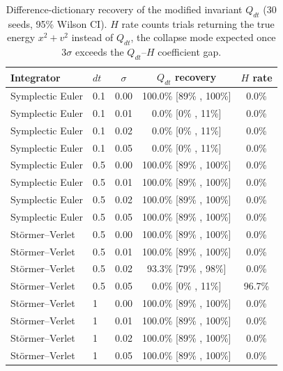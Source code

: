 \documentclass{article}
\begin{document}
\begin{table}[ht]
\centering
\caption{Difference-dictionary recovery of the modified invariant $Q_{dt}$ (30 seeds, 95\% Wilson CI). $H$ rate counts trials returning the true energy $x^2+v^2$ instead of $Q_{dt}$, the collapse mode expected once $3\sigma$ exceeds the $Q_{dt}$--$H$ coefficient gap.}
\label{tab:diff-dict-generality}
\begin{tabular}{llccc}
\toprule
Integrator & $dt$ & $\sigma$ & $Q_{dt}$ recovery & $H$ rate \\
\midrule
Symplectic Euler & 0.1 & 0.00 & 100.0\% [89\% , 100\%] & 0.0\% \\
Symplectic Euler & 0.1 & 0.01 & 0.0\% [0\% , 11\%] & 0.0\% \\
Symplectic Euler & 0.1 & 0.02 & 0.0\% [0\% , 11\%] & 0.0\% \\
Symplectic Euler & 0.1 & 0.05 & 0.0\% [0\% , 11\%] & 0.0\% \\
Symplectic Euler & 0.5 & 0.00 & 100.0\% [89\% , 100\%] & 0.0\% \\
Symplectic Euler & 0.5 & 0.01 & 100.0\% [89\% , 100\%] & 0.0\% \\
Symplectic Euler & 0.5 & 0.02 & 100.0\% [89\% , 100\%] & 0.0\% \\
Symplectic Euler & 0.5 & 0.05 & 100.0\% [89\% , 100\%] & 0.0\% \\
St\"{o}rmer--Verlet & 0.5 & 0.00 & 100.0\% [89\% , 100\%] & 0.0\% \\
St\"{o}rmer--Verlet & 0.5 & 0.01 & 100.0\% [89\% , 100\%] & 0.0\% \\
St\"{o}rmer--Verlet & 0.5 & 0.02 & 93.3\% [79\% , 98\%] & 0.0\% \\
St\"{o}rmer--Verlet & 0.5 & 0.05 & 0.0\% [0\% , 11\%] & 96.7\% \\
St\"{o}rmer--Verlet & 1 & 0.00 & 100.0\% [89\% , 100\%] & 0.0\% \\
St\"{o}rmer--Verlet & 1 & 0.01 & 100.0\% [89\% , 100\%] & 0.0\% \\
St\"{o}rmer--Verlet & 1 & 0.02 & 100.0\% [89\% , 100\%] & 0.0\% \\
St\"{o}rmer--Verlet & 1 & 0.05 & 100.0\% [89\% , 100\%] & 0.0\% \\
\bottomrule
\end{tabular}
\end{table}
\end{document}
